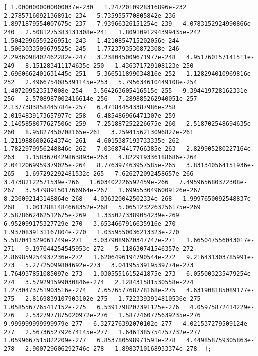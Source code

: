 \documentclass[11pt]{article}
\begin{document}
\begin{Verbatim}[commandchars=\\\{\}]
[ 1.0000000000000037e-230   1.2472010928316896e-232   2.2785716092136891e-234   5.735955770805842e-236   1.8971879554007675e-237   7.93966326151254e-239   4.0783152924990866e-240   2.5081275383131308e-241   1.8091091294399435e-242   1.5042996559226951e-243   1.4210854715202056e-244   1.5063033509679525e-245   1.7723793530872308e-246   2.2936098402462282e-247   3.238045009671977e-248   4.951760157141511e-249   8.151283411174635e-250   1.436371729108123e-250   2.6960662401631445e-251   5.366511899034816e-252   1.128294010969816e-252   2.4966754085391145e-253   5.795634610449108e-254   1.407209523517008e-254   3.564263605416515e-255   9.394419728162331e-256   2.5708987002416614e-256   7.289885262940051e-257   2.1377383858445784e-257   6.471844543387986e-258   2.0194839173657977e-258   6.485486966471307e-259   2.1405858077627506e-259   7.251887252226675e-260   2.518702548694635e-260   8.95827450708165e-261   3.2594156213096827e-261   1.2119886002624374e-261   4.6015387193733335e-262   1.7822979956248846e-262   7.036874417766385e-263   2.829905280227164e-263   1.1583670429863893e-263   4.822919336188686e-264   2.0412069959379025e-264   8.776397463957585e-265   3.831340564151936e-265   1.697292292481532e-265   7.626272092458657e-266   3.47382122571539e-266   1.603402226592459e-266   7.495965680372308e-267   3.5479891501766964e-267   1.6995530496009126e-267   8.236092143148864e-268   4.036320042502334e-268   1.9997650092548837e-268   1.0012881484668352e-268   5.0651232263256175e-269   2.5878662462512675e-269   1.3350273389054239e-269   6.952099175327729e-270   3.6534667916635916e-270   1.9370839131167804e-270   1.0359550036213323e-270   5.587041329061749e-271   3.0379089620347747e-271   1.665047556043017e-271   9.197044254545953e-272   5.118630741546357e-272   2.869859254937236e-272   1.6206496194790544e-272   9.216431303785991e-273   5.27725099804692e-273   3.0419553919539774e-273   1.764937851085097e-273   1.0305551615241875e-273   6.055003235479254e-274   3.579291599030846e-274   2.128431581530558e-274   1.2730473751903516e-274   7.657657768778168e-275   4.631908185089177e-275   2.8169839107903102e-275   1.7223393914810536e-275   1.0585567765417152e-275   6.5391798207391125e-276   4.05975872414229e-276   2.5327977875020972e-276   1.5877460775639235e-276   9.999999999999979e-277   6.327276392070102e-277   4.021537279509124e-277   2.5673652792674145e-277   1.6461385754757732e-277   1.0599667515822209e-277   6.853780598971591e-278   4.449858759305863e-278   2.900729606292746e-278   1.8983710168933374e-278  ];

\end{Verbatim}
\end{document}
